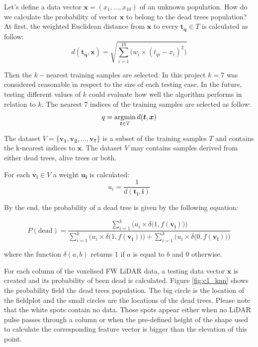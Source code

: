 \documentclass{subfiles}
\begin{document}
\par Let's define a data vector $\boldsymbol{x}=(x_1,\dots,x_10)$ of an unknown population. How do we calculate the probability of vector $\boldsymbol{x}$ to belong to the dead trees population? At first, the weighted Euclidean distance from $\boldsymbol{x}$ to every $\boldsymbol{t_q} \in T$ is calculated as follow:
\begin{equation} 
d(\boldsymbol{t_q},\boldsymbol{x}) = \sqrt{\sum_{i=1}^{10}{ \Big(w_i \times (t_{qi}-x_i)^2 \Big)}}
\end{equation}


\par Then the $k-$nearest training samples are selected. In this project $k=7$ was considered reasonable in respect to the size of each testing case. In the future, testing different values of $k$ could evaluate how well the algorithm performs in relation to $k$. The nearest $7$ indices of the training samples are selected as follow:
\begin{equation} 
q = \operatornamewithlimits{argmin}_{\boldsymbol{t} \in T} d(\boldsymbol{t},\boldsymbol{x})
\end{equation}
\par The dataset $V=\{\boldsymbol{v_1}, \boldsymbol{v_2},\dots, \boldsymbol{v_7}\} $ is a subset of the training samples $T$ and contains the k-nearest indices to $\boldsymbol{x}$. The dataset $V$ may contains samples derived from either dead trees, alive trees or both. 


\par For each $\boldsymbol{v_i} \in V$ a weight $\boldsymbol{u_i}$ is calculated:
\begin{equation} 
u_i = \frac{1}{d(\boldsymbol{t_i}, \boldsymbol{i})}
\end{equation}

\par By the end, the probability of a dead tree is given by the following equation: 

\begin{equation} 
P(\textrm{dead}) =  \frac{\sum_{i=1}^{k}{ \Big(u_i \times \delta \big(1,f(\boldsymbol{v_i})\big)\Big)}}{ \sum_{i=1}^{k}{\Big(u_i \times \delta \big(1,f(\boldsymbol{v_i})\big)\Big)} + \sum_{i=1}^{k}{ \Big(u_i \times \delta \big(0,f(\boldsymbol{v_i})\big)\Big)}}
\end{equation}

where the function $\delta(a,b)$ returns $1$ if $a$ is equal to $b$ and $0$ otherwise. 

\par For each column of the voxelised FW LiDAR data, a testing data vector $\boldsymbol{x}$ is created and its probability of been dead is calculated. Figure \ref{fig:c1_knn} shows the probability field the dead trees population. The big circle is the location of the fieldplot and the small circles are the locations of the dead trees. Please note that the white spots contain no data. Those spots appear either when no LiDAR pulse passes through a column or when the pre-defined height of the shape used to calculate the corresponding feature vector is bigger than the elevation of this point. 
\end{document}
